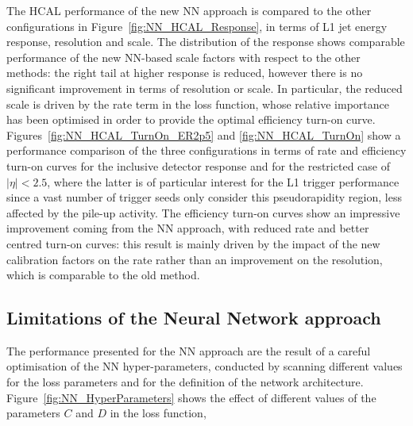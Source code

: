 The HCAL performance of the new NN approach is compared to the other configurations in Figure~\ref{fig:NN_HCAL_Response}, in terms of L1 jet energy response, resolution and scale. The distribution of the response shows comparable performance of the new NN-based scale factors with respect to the other methods: the right tail at higher response is reduced, however there is no significant improvement in terms of resolution or scale. In particular, the reduced scale is driven by the rate term in the loss function, whose relative importance has been optimised in order to provide the optimal efficiency turn-on curve. Figures~\ref{fig:NN_HCAL_TurnOn_ER2p5} and \ref{fig:NN_HCAL_TurnOn} show a performance comparison of the three configurations in terms of rate and efficiency turn-on curves for the inclusive detector response and for the restricted case of $|\eta|<2.5$, where the latter is of particular interest for the L1 trigger performance since a vast number of trigger seeds only consider this pseudorapidity region, less affected by the pile-up activity.
The efficiency turn-on curves show an impressive improvement coming from the NN approach, with reduced rate and better centred turn-on curves: this result is mainly driven by the impact of the new calibration factors on the rate rather than an improvement on the resolution, which is comparable to the old method.

\subsection{Limitations of the Neural Network approach} %

The performance presented for the NN approach are the result of a careful optimisation of the NN hyper-parameters, conducted by scanning different values for the loss parameters and for the definition of the network architecture. Figure~\ref{fig:NN_HyperParameters} shows the effect of different values of the parameters $C$ and $D$ in the loss function, 

